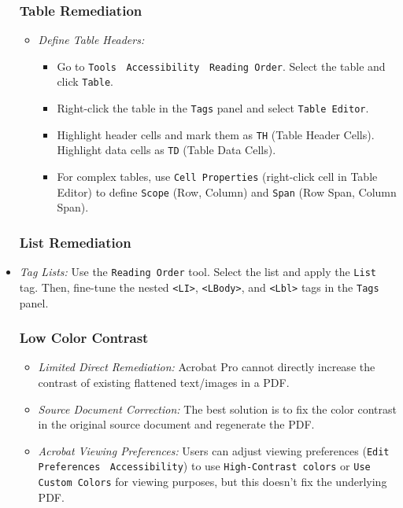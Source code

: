 \begin{itemize}
\subsubsection{Table Remediation}
\label{subsubsec:table-remediation}

\begin{itemize}
\item \emph{Define Table Headers:}
    \begin{itemize}
    \item Go to \texttt{Tools} $\>$ \texttt{Accessibility} $\>$ \texttt{Reading Order}. Select the table and click \texttt{Table}.
    \item Right-click the table in the \texttt{Tags} panel and select \texttt{Table Editor}.
    \item Highlight header cells and mark them as \texttt{TH} (Table Header Cells). Highlight data cells as \texttt{TD} (Table Data Cells).
    \item For complex tables, use \texttt{Cell Properties} (right-click cell in Table Editor) to define \texttt{Scope} (Row, Column) and \texttt{Span} (Row Span, Column Span).
    \end{itemize}
\end{itemize}

\subsubsection{List Remediation}
\label{subsubsec:list-remediation}

\item \emph{Tag Lists:} Use the \texttt{Reading Order} tool. Select the list and apply the \texttt{List} tag. Then, fine-tune the nested \texttt{<LI>}, \texttt{<LBody>}, and \texttt{<Lbl>} tags in the \texttt{Tags} panel.

\subsubsection{Low Color Contrast}

\begin{itemize}
\item \emph{Limited Direct Remediation:} Acrobat Pro cannot directly increase the contrast of existing flattened text/images in a PDF.
\item \emph{Source Document Correction:} The best solution is to fix the color contrast in the original source document and regenerate the PDF.
\item \emph{Acrobat Viewing Preferences:} Users can adjust viewing preferences (\texttt{Edit} $\>$ \texttt{Preferences} $\>$ \texttt{Accessibility}) to use \texttt{High-Contrast colors} or \texttt{Use Custom Colors} for viewing purposes, but this doesn't fix the underlying PDF.
\end{itemize}


\end{itemize}
